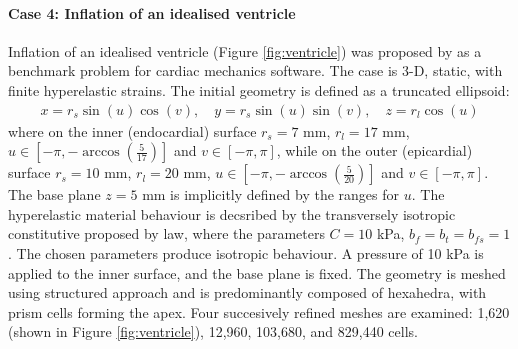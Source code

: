 \documentclass[sn-mathphys,Numbered]{sn-jnl}%
\begin{document}
\paragraph{Case 4: Inflation of an idealised ventricle}
Inflation of an idealised ventricle (Figure \ref{fig:ventricle}) was proposed by \citet{Land2015} as a benchmark problem for cardiac mechanics software.
The case is 3-D, static, with finite hyperelastic strains.
The initial geometry is defined as a truncated ellipsoid:
\begin{eqnarray}
	x = r_s \sin(u) \cos(v), \quad
	y = r_s \sin(u) \sin(v), \quad
	z = r_l \cos(u)
\end{eqnarray}
where on the inner (endocardial) surface $r_s =7$ mm, $r_l = 17$ mm, $u \in \left[-\pi, -\arccos \left( \frac{5}{17} \right) \right]$ and $v \in \left[-\pi, \pi \right]$, while on the outer (epicardial) surface $r_s =10$ mm, $r_l = 20$ mm, $u \in \left[-\pi, -\arccos \left( \frac{5}{20} \right) \right]$ and $v \in \left[-\pi, \pi \right]$.
The base plane $z = 5$ mm is implicitly defined by the ranges for $u$.
The hyperelastic material behaviour is decsribed by the transversely isotropic constitutive proposed by \citet{Guccione1995} law, where the parameters $C = 10$ kPa, $b_f = b_t = b_{fs} = 1$.
The chosen parameters produce isotropic behaviour.
A pressure of 10 kPa is applied to the inner surface, and the base plane is fixed.
The geometry is meshed using structured approach and is predominantly composed of hexahedra, with prism cells forming the apex.
Four succesively refined meshes are examined: 1,620 (shown in Figure  \ref{fig:ventricle}), 12,960, 103,680, and 829,440 cells.
\end{document}

